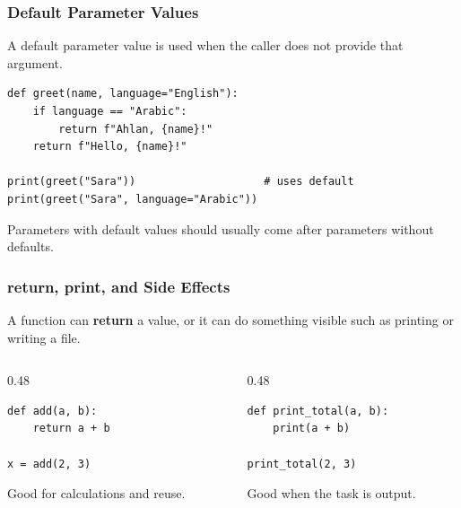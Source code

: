 \documentclass[aspectratio=169,10pt]{beamer}
\newcommand{\keyword}[1]{\textcolor{PrimaryBlue}{\textbf{#1}}}
\begin{document}
\begin{frame}[fragile]
\frametitle{Default Parameter Values}
\small
A default parameter value is used when the caller does not provide that argument.

\vspace{0.15cm}
\begin{lstlisting}[style=pycode]
def greet(name, language="English"):
    if language == "Arabic":
        return f"Ahlan, {name}!"
    return f"Hello, {name}!"

print(greet("Sara"))                    # uses default
print(greet("Sara", language="Arabic"))
\end{lstlisting}

\begin{tcolorbox}[lecturebox,title=Rule]
Parameters with default values should usually come after parameters without defaults.
\end{tcolorbox}
\end{frame}

\begin{frame}[fragile]
\frametitle{return, print, and Side Effects}
\small
A function can \keyword{return} a value, or it can do something visible such as printing or writing a file.

\vspace{0.1cm}
\begin{columns}[T,totalwidth=0.96\textwidth]
\begin{column}{0.48\textwidth}
\begin{tcolorbox}[lecturebox,title=Returns a value]
\begin{lstlisting}[style=pycode]
def add(a, b):
    return a + b

x = add(2, 3)
\end{lstlisting}
Good for calculations and reuse.
\end{tcolorbox}
\end{column}
\begin{column}{0.48\textwidth}
\begin{tcolorbox}[lecturebox,title=Has a side effect]
\begin{lstlisting}[style=pycode]
def print_total(a, b):
    print(a + b)

print_total(2, 3)
\end{lstlisting}
Good when the task is output.
\end{tcolorbox}
\end{column}
\end{columns}
\end{frame}
\end{document}
